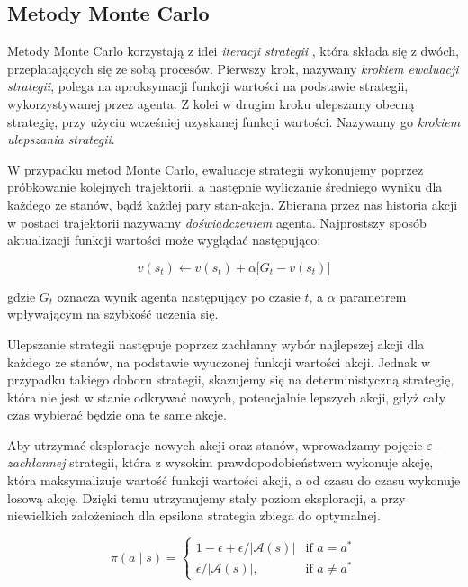 \documentclass[licencjacka]{pracamgr}
\begin{document}
\subsection{Metody Monte Carlo}

Metody Monte Carlo korzystają z idei \emph{iteracji strategii} \cite{policy-iteration}, która składa się z dwóch, przeplatających się ze sobą procesów. Pierwszy krok, nazywany \emph{krokiem ewaluacji strategii}, polega na aproksymacji funkcji wartości na podstawie strategii, wykorzystywanej przez agenta. Z kolei w drugim kroku ulepszamy obecną strategię, przy użyciu wcześniej uzyskanej funkcji wartości. Nazywamy go \emph{krokiem ulepszania strategii}.

W przypadku metod Monte Carlo, ewaluacje strategii wykonujemy poprzez próbkowanie kolejnych trajektorii, a następnie wyliczanie średniego wyniku dla każdego ze stanów, bądź każdej pary stan-akcja. Zbierana przez nas historia akcji w postaci trajektorii nazywamy \emph{doświadczeniem} agenta. Najprostszy sposób aktualizacji funkcji wartości może wyglądać następująco:

$$ v(s_t) \leftarrow v(s_t) + \alpha \big[G_t - v(s_t)\big] $$

gdzie $G_t$ oznacza wynik agenta następujący po czasie $t$, a $\alpha$ parametrem wpływającym na szybkość uczenia się.

Ulepszanie strategii następuje poprzez zachłanny wybór najlepszej akcji dla każdego ze stanów, na podstawie wyuczonej funkcji wartości akcji. Jednak w przypadku takiego doboru strategii, skazujemy się na deterministyczną strategię, która nie jest w stanie odkrywać nowych, potencjalnie lepszych akcji, gdyż cały czas wybierać będzie ona te same akcje. 

Aby utrzymać eksploracje nowych akcji oraz stanów, wprowadzamy pojęcie \emph{$\varepsilon$--zachłannej} strategii, która z wysokim prawdopodobieństwem wykonuje akcję, która maksymalizuje wartość funkcji wartości akcji, a od czasu do czasu wykonuje losową akcję. Dzięki temu utrzymujemy stały poziom eksploracji, a przy niewielkich założeniach dla epsilona strategia zbiega do optymalnej.

$$
\pi(a \mid s) =
\begin{cases}
    1 - \epsilon + \epsilon/\lvert \mathcal{A}(s) \rvert & \text{if } a = a^\ast \\
    \epsilon/\lvert \mathcal{A}(s) \rvert,              & \text{if } a\neq a^\ast
\end{cases}
$$
\end{document}
